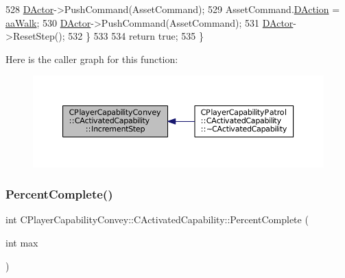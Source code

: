 \begin{DoxyCode}
528         \hyperlink{classCActivatedPlayerCapability_a54ca944b47bff2718330639941d402b0}{DActor}->PushCommand(AssetCommand);
529         AssetCommand.\hyperlink{structSAssetCommand_a8edd3b3d59a76d5514ba403bc8076a75}{DAction} = \hyperlink{GameDataTypes_8h_ab47668e651a3032cfb9c40ea2d60d670a60ca9010aa62b73c1aab838ff4bf7276}{aaWalk};
530         \hyperlink{classCActivatedPlayerCapability_a54ca944b47bff2718330639941d402b0}{DActor}->PushCommand(AssetCommand);
531         \hyperlink{classCActivatedPlayerCapability_a54ca944b47bff2718330639941d402b0}{DActor}->ResetStep();
532     \}
533     
534     \textcolor{keywordflow}{return} \textcolor{keyword}{true};
535 \}
\end{DoxyCode}
Here is the caller graph for this function\+:\nopagebreak
\begin{figure}[H]
\begin{center}
\leavevmode
\includegraphics[width=350pt]{classCPlayerCapabilityConvey_1_1CActivatedCapability_ac1bf251eca552885041b1bcefa594591_icgraph}
\end{center}
\end{figure}
\hypertarget{classCPlayerCapabilityConvey_1_1CActivatedCapability_aec6b75fc004f4ac18755d8f601c8ffca}{}\label{classCPlayerCapabilityConvey_1_1CActivatedCapability_aec6b75fc004f4ac18755d8f601c8ffca} 
\subsubsection{\texorpdfstring{Percent\+Complete()}{PercentComplete()}}
{\footnotesize\ttfamily int C\+Player\+Capability\+Convey\+::\+C\+Activated\+Capability\+::\+Percent\+Complete (\begin{DoxyParamCaption}\item[{int}]{max }\end{DoxyParamCaption})\hspace{0.3cm}{\ttfamily [virtual]}}



